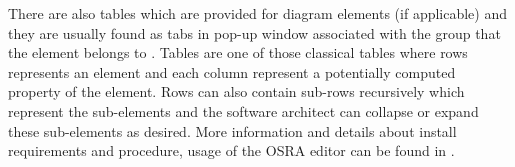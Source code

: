 There are also tables which are provided for diagram elements (if applicable) and they are usually found as tabs in pop-up window associated with the group that the element belongs to \cite{OSRAEditor}. Tables are one of those classical tables where rows represents an element and each column represent a potentially computed property of the element. Rows can also contain sub-rows recursively which represent the sub-elements and the software architect can collapse or expand these sub-elements as desired. More information and details about install requirements and procedure, usage of the OSRA editor can be found in \cite{OSRAEditor}.    
    

  